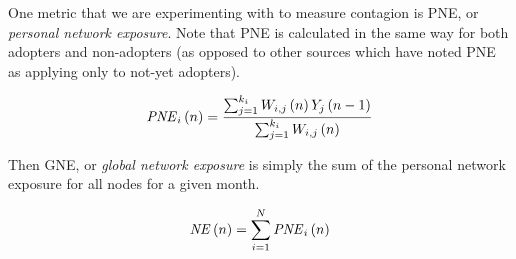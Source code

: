 \documentclass[12pt]{article}
\begin{document}
One metric that we are experimenting with to measure contagion is PNE, or \emph{personal network exposure}. Note that PNE is calculated in the same way for both adopters and non-adopters (as opposed to other sources which have noted PNE as applying only to not-yet adopters).

\begin{equation}
{\it PNE}_{{i}} \left( n \right) ={\frac {\sum _{j=1}^{k_{{i}}}
 W_{{i,j}} \left( n \right) Y_{{j}} \left( n-1
 \right) }{\sum _{j=1}^{k_{{i}}}  W_{{i,j}} \left( n
 \right) }}
 \label{eq:PNE}
\end{equation}

Then GNE, or \emph{global network exposure} is simply the sum of the personal network exposure for all nodes for a given month.
 
\begin{equation}
{\it NE} \left( n \right) =\sum _{i=1}^{N}{\it PNE}_{{i}} \left( n
 \right) 
\end{equation}


%
\end{document}
